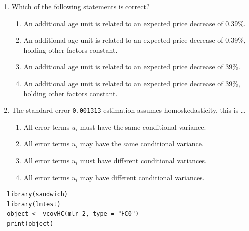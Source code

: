 \documentclass{article}
\begin{document}
\begin{enumerate}[resume]
  \item Which of the following statements is correct?
  \begin{enumerate}[label=\Alph*)]
    \item An additional age unit is related to an expected price decrease of 0.39\%.
    \item An additional age unit is related to an expected price decrease of 0.39\%, holding other factors constant.
    \item An additional age unit is related to an expected price decrease of 39\%.
    \item An additional age unit is related to an expected price decrease of 39\%, holding other factors constant.
  \end{enumerate}
  \item The standard error \texttt{0.001313} estimation assumes homoskedasticity, this is \dots
  \begin{enumerate}[label=\Alph*)]
    \item All error terms $u_i$ must have the same conditional variance.
    \item All error terms $u_i$ may have the same conditional variance.
    \item All error terms $u_i$ must have different conditional variances.
    \item All error terms $u_i$ may have different conditional variances.
  \end{enumerate}
\end{enumerate}

\newpage

\begin{lstlisting}
  library(sandwich)  
  library(lmtest)   
  object <- vcovHC(mlr_2, type = "HC0")
  print(object)
\end{lstlisting}
\end{document}
